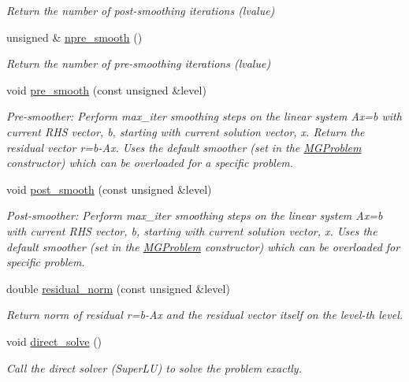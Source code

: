 \begin{DoxyCompactItemize}
\begin{DoxyCompactList}\small\item\em Return the number of post-\/smoothing iterations (lvalue) \end{DoxyCompactList}\item 
unsigned \& \hyperlink{classoomph_1_1MGSolver_acfe72d9cc2743740a3e148e91919bf74}{npre\+\_\+smooth} ()
\begin{DoxyCompactList}\small\item\em Return the number of pre-\/smoothing iterations (lvalue) \end{DoxyCompactList}\item 
void \hyperlink{classoomph_1_1MGSolver_ac44511f43e0029f325f09d297d46134e}{pre\+\_\+smooth} (const unsigned \&level)
\begin{DoxyCompactList}\small\item\em Pre-\/smoother\+: Perform \textquotesingle{}max\+\_\+iter\textquotesingle{} smoothing steps on the linear system Ax=b with current R\+HS vector, b, starting with current solution vector, x. Return the residual vector r=b-\/\+Ax. Uses the default smoother (set in the \hyperlink{classoomph_1_1MGProblem}{M\+G\+Problem} constructor) which can be overloaded for a specific problem. \end{DoxyCompactList}\item 
void \hyperlink{classoomph_1_1MGSolver_a449bc7f6ebf7ba7bc517c7712373c68d}{post\+\_\+smooth} (const unsigned \&level)
\begin{DoxyCompactList}\small\item\em Post-\/smoother\+: Perform max\+\_\+iter smoothing steps on the linear system Ax=b with current R\+HS vector, b, starting with current solution vector, x. Uses the default smoother (set in the \hyperlink{classoomph_1_1MGProblem}{M\+G\+Problem} constructor) which can be overloaded for specific problem. \end{DoxyCompactList}\item 
double \hyperlink{classoomph_1_1MGSolver_ae1780530c59f06913884eec764a4b6cc}{residual\+\_\+norm} (const unsigned \&level)
\begin{DoxyCompactList}\small\item\em Return norm of residual r=b-\/\+Ax and the residual vector itself on the level-\/th level. \end{DoxyCompactList}\item 
void \hyperlink{classoomph_1_1MGSolver_a966b9775086c2a238c212605a9bb16de}{direct\+\_\+solve} ()
\begin{DoxyCompactList}\small\item\em Call the direct solver (Super\+LU) to solve the problem exactly. \end{DoxyCompactList}\item 

\end{DoxyCompactItemize}
